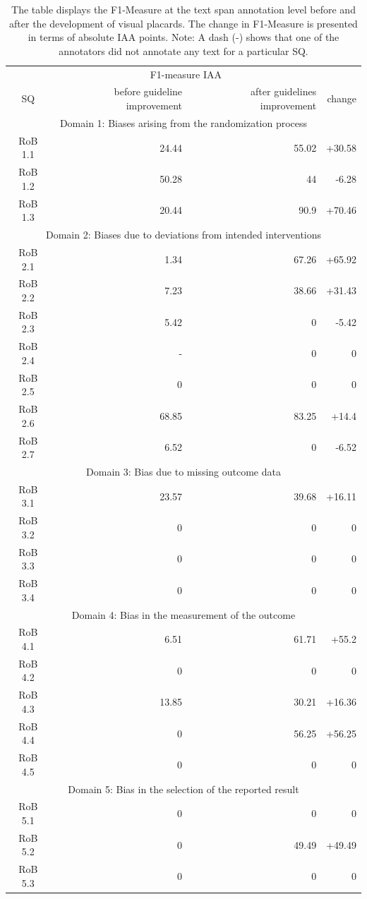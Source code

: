 \documentclass[sn-mathphys,Numbered]{sn-jnl}%
\theoremstyle{thmstyleone}%
\theoremstyle{thmstyletwo}%
\theoremstyle{thmstylethree}%
\begin{document}
\begin{table}[htb]
    \caption{The table displays the F1-Measure at the text span annotation level before and after the development of visual placards. The change in F1-Measure is presented in terms of absolute IAA points. Note: A dash (-) shows that one of the annotators did not annotate any text for a particular SQ.}
    \label{tab:IAA_sq}
    \centering
    \begin{tabular}{crrr}
    \toprule[1.0pt]
         & \multicolumn{2}{c}{F1-measure IAA} & \\
        SQ & before guideline improvement & after guidelines improvement & change \\
    \midrule[1.0pt]
        \multicolumn{4}{c}{Domain 1: Biases arising from the randomization process} \\
        \hline
        RoB 1.1 & 24.44 & 55.02 & +30.58 \\ 
        RoB 1.2 & 50.28 & 44 & -6.28 \\ 
        RoB 1.3 & 20.44 & 90.9 & +70.46 \\
        \hline
        \multicolumn{4}{c}{Domain 2: Biases due to deviations from intended interventions} \\
        \hline
        RoB 2.1 & 1.34 & 67.26 & +65.92 \\ 
        RoB 2.2 & 7.23 & 38.66 & +31.43 \\ 
        RoB 2.3 & 5.42 & 0 & -5.42 \\ 
        RoB 2.4 & - & 0 & 0 \\ 
        RoB 2.5 & 0 & 0 & 0 \\ 
        RoB 2.6 & 68.85 & 83.25 & +14.4 \\ 
        RoB 2.7 & 6.52 & 0 & -6.52 \\ 
        \hline
        \multicolumn{4}{c}{Domain 3: Bias due to missing outcome data} \\
        \hline
        RoB 3.1 & 23.57 & 39.68 & +16.11 \\ 
        RoB 3.2 & 0 & 0 & 0 \\ 
        RoB 3.3 & 0 & 0 & 0 \\ 
        RoB 3.4 & 0 & 0 & 0 \\ 
        \hline
        \multicolumn{4}{c}{Domain 4: Bias in the measurement of the outcome} \\
        \hline
        RoB 4.1 & 6.51 & 61.71 & +55.2 \\ 
        RoB 4.2 & 0 & 0 & 0 \\ 
        RoB 4.3 & 13.85 & 30.21 & +16.36 \\ 
        RoB 4.4 & 0 & 56.25 & +56.25 \\ 
        RoB 4.5 & 0 & 0 & 0 \\ 
        \hline
        \multicolumn{4}{c}{Domain 5: Bias in the selection of the reported result} \\
        \hline
        RoB 5.1 & 0 & 0 & 0 \\ 
        RoB 5.2 & 0 & 49.49 & +49.49 \\ 
        RoB 5.3 & 0 & 0 & 0 \\
    \bottomrule[1.0pt]
    \end{tabular}
\end{table}
%
%
%
\end{document}

